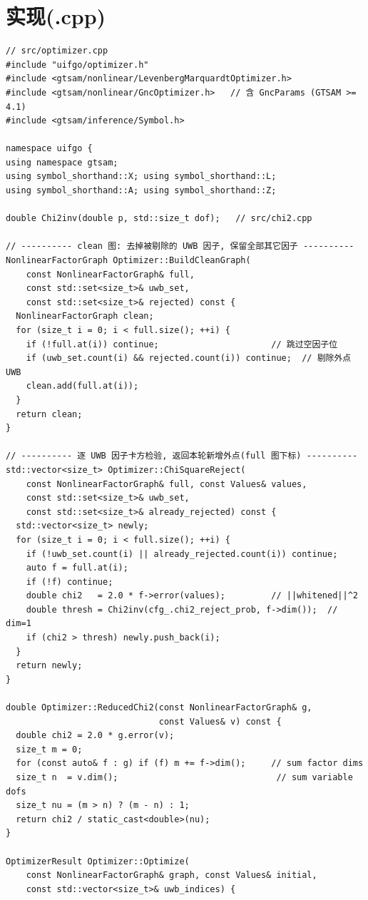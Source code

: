 \documentclass[11pt,a4paper]{report}
\begin{document}
\section{实现(.cpp)}
\begin{lstlisting}[style=cpp]
// src/optimizer.cpp
#include "uifgo/optimizer.h"
#include <gtsam/nonlinear/LevenbergMarquardtOptimizer.h>
#include <gtsam/nonlinear/GncOptimizer.h>   // 含 GncParams (GTSAM >= 4.1)
#include <gtsam/inference/Symbol.h>

namespace uifgo {
using namespace gtsam;
using symbol_shorthand::X; using symbol_shorthand::L;
using symbol_shorthand::A; using symbol_shorthand::Z;

double Chi2inv(double p, std::size_t dof);   // src/chi2.cpp

// ---------- clean 图: 去掉被剔除的 UWB 因子, 保留全部其它因子 ----------
NonlinearFactorGraph Optimizer::BuildCleanGraph(
    const NonlinearFactorGraph& full,
    const std::set<size_t>& uwb_set,
    const std::set<size_t>& rejected) const {
  NonlinearFactorGraph clean;
  for (size_t i = 0; i < full.size(); ++i) {
    if (!full.at(i)) continue;                      // 跳过空因子位
    if (uwb_set.count(i) && rejected.count(i)) continue;  // 剔除外点 UWB
    clean.add(full.at(i));
  }
  return clean;
}

// ---------- 逐 UWB 因子卡方检验, 返回本轮新增外点(full 图下标) ----------
std::vector<size_t> Optimizer::ChiSquareReject(
    const NonlinearFactorGraph& full, const Values& values,
    const std::set<size_t>& uwb_set,
    const std::set<size_t>& already_rejected) const {
  std::vector<size_t> newly;
  for (size_t i = 0; i < full.size(); ++i) {
    if (!uwb_set.count(i) || already_rejected.count(i)) continue;
    auto f = full.at(i);
    if (!f) continue;
    double chi2   = 2.0 * f->error(values);         // ||whitened||^2
    double thresh = Chi2inv(cfg_.chi2_reject_prob, f->dim());  // dim=1
    if (chi2 > thresh) newly.push_back(i);
  }
  return newly;
}

double Optimizer::ReducedChi2(const NonlinearFactorGraph& g,
                              const Values& v) const {
  double chi2 = 2.0 * g.error(v);
  size_t m = 0;
  for (const auto& f : g) if (f) m += f->dim();     // sum factor dims
  size_t n  = v.dim();                               // sum variable dofs
  size_t nu = (m > n) ? (m - n) : 1;
  return chi2 / static_cast<double>(nu);
}

OptimizerResult Optimizer::Optimize(
    const NonlinearFactorGraph& graph, const Values& initial,
    const std::vector<size_t>& uwb_indices) {


\end{lstlisting}
\end{document}
